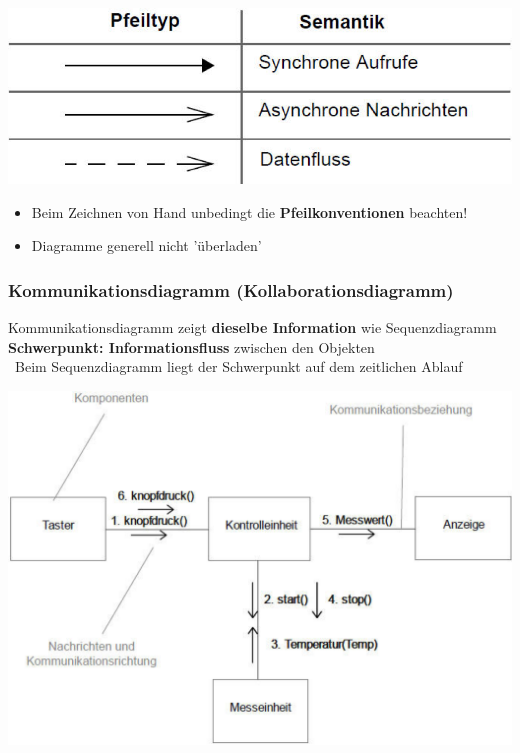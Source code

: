 \begin{minipage}[c]{0.45\columnwidth}
    \includegraphics[width=\columnwidth]{images/sequenzdiagramm_pfeile.png}
\end{minipage}
\hfill
\begin{minipage}[c]{0.52\columnwidth}
    \begin{itemize}
        \item Beim Zeichnen von Hand unbedingt die \textbf{Pfeilkonventionen} beachten!
        \item Diagramme generell nicht 'überladen'
    \end{itemize}
\end{minipage}

\columnbreak


\subsubsection{Kommunikationsdiagramm (Kollaborationsdiagramm)}

\begin{outline}
    \1 Kommunikationsdiagramm zeigt \textbf{dieselbe Information} wie Sequenzdiagramm
    \1 \textbf{Schwerpunkt: Informationsfluss} zwischen den Objekten \\
    \textrightarrow\ Beim Sequenzdiagramm liegt der Schwerpunkt auf dem zeitlichen Ablauf
\end{outline}

\begin{center}
    \includegraphics[width=0.7\columnwidth]{images/kommunikationsdiagramm.png}
\end{center}



